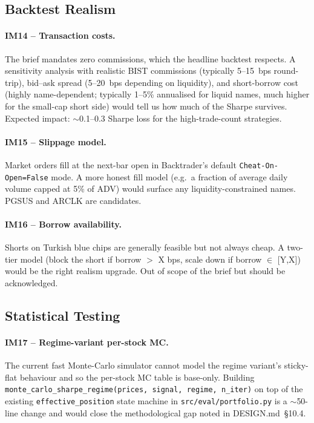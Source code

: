 \documentclass[11pt,a4paper]{article}
\begin{document}
\subsection{Backtest Realism}

\paragraph{IM14 -- Transaction costs.} The brief mandates zero commissions,
which the headline backtest respects. A sensitivity analysis with realistic
BIST commissions (typically 5--15~bps round-trip), bid--ask spread (5--20~bps
depending on liquidity), and short-borrow cost (highly name-dependent;
typically 1--5\% annualised for liquid names, much higher for the small-cap
short side) would tell us how much of the Sharpe survives. Expected impact:
$\sim$0.1--0.3 Sharpe loss for the high-trade-count strategies.

\paragraph{IM15 -- Slippage model.} Market orders fill at the next-bar open
in Backtrader's default \texttt{Cheat-On-Open=False} mode. A more honest
fill model (e.g.\ a fraction of average daily volume capped at 5\% of ADV)
would surface any liquidity-constrained names. PGSUS and ARCLK are
candidates.

\paragraph{IM16 -- Borrow availability.} Shorts on Turkish blue chips are
generally feasible but not always cheap. A two-tier model (block the short
if borrow $>$ X bps, scale down if borrow $\in$ [Y,X]) would be the right
realism upgrade. Out of scope of the brief but should be acknowledged.

\subsection{Statistical Testing}

\paragraph{IM17 -- Regime-variant per-stock MC.} The current fast Monte-Carlo
simulator cannot model the regime variant's sticky-flat behaviour and so the
per-stock MC table is base-only. Building
\texttt{monte\_carlo\_sharpe\_regime(prices, signal, regime, n\_iter)} on top
of the existing \texttt{effective\_position} state machine in
\texttt{src/eval/portfolio.py} is a $\sim$50-line change and would close the
methodological gap noted in DESIGN.md~\S10.4.
\end{document}
